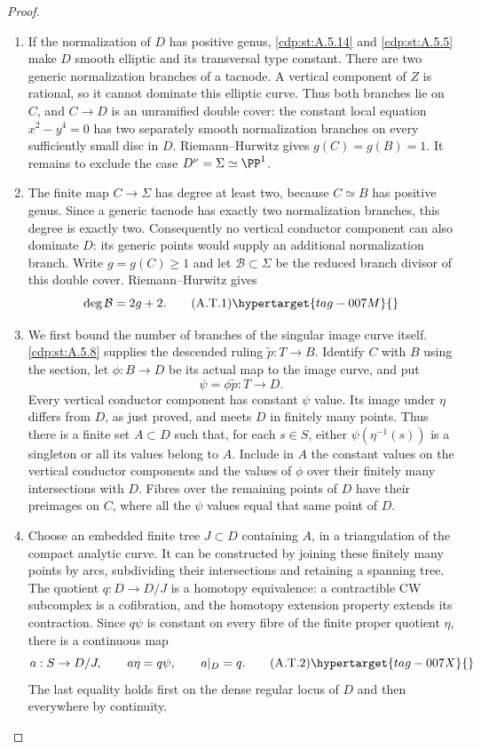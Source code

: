 \begin{proof}

\begin{enumerate}[label={$\langle1\rangle$\arabic*.},leftmargin=*]
\item If the normalization of $D$ has positive genus, \ref{cdp:st:A.5.14}
and \ref{cdp:st:A.5.5} make $D$ smooth elliptic and its transversal
type constant. There are two generic normalization
branches of a tacnode. A vertical component of $Z$
is rational, so it cannot dominate this elliptic curve.
Thus both branches lie on $C$, and $C\to D$ is an
unramified double cover: the constant local equation
$x^2-y^4=0$ has two separately smooth normalization
branches on every sufficiently small disc in $D$.
Riemann--Hurwitz gives $g(C)=g(B)=1$.
It remains to exclude the case $D^\nu=\Sigma\simeq\PP^1$.

\item The finite map $C\to\Sigma$ has degree at least two,
because $C\simeq B$ has positive genus. Since a generic
tacnode has exactly two normalization branches, this
degree is exactly two. Consequently no vertical
conductor component can also dominate $D$: its generic
points would supply an additional normalization branch.
Write $g=g(C)\ge1$ and let $\mathcal B\subset\Sigma$
be the reduced branch divisor of this double cover.
Riemann--Hurwitz gives
\[
                   \deg\mathcal B=2g+2.             \tag{A.T.1}\hypertarget{tag-007M}{}\label{cdp:eq:A.T.1}
\]

\item We first bound the number of branches of the singular
image curve itself. \ref{cdp:st:A.5.8} supplies the descended ruling
$\widetilde p:T\to B$. Identify $C$ with $B$ using the
section, let $\phi:B\to D$ be its actual map to the
image curve, and put
\[
                    \psi=\phi\widetilde p:T\to D.
\]
Every vertical conductor component has constant $\psi$
value. Its image under $\eta$ differs from $D$, as just
proved, and meets $D$ in finitely many points. Thus
there is a finite set $A\subset D$ such that, for each
$s\in S$, either $\psi(\eta^{-1}(s))$ is a singleton
or all its values belong to $A$. Include in $A$ the
constant values on the vertical conductor components
and the values of $\phi$ over their finitely many
intersections with $D$. Fibres over the remaining
points of $D$ have their preimages on $C$, where all
the $\psi$ values equal that same point of $D$.

\item Choose an embedded finite tree $J\subset D$ containing
$A$, in a triangulation of the compact analytic curve.
It can be constructed by joining these finitely many
points by arcs, subdividing their intersections and
retaining a spanning tree. The quotient
$q:D\to D/J$ is a homotopy equivalence: a contractible
CW subcomplex is a cofibration, and the homotopy
extension property extends its contraction. Since
$q\psi$ is constant on every fibre of the finite
proper quotient $\eta$, there is a continuous map
\[
 a:S\to D/J,\qquad a\eta=q\psi,\qquad a|_D=q.     \tag{A.T.2}\hypertarget{tag-007X}{}\label{cdp:eq:A.T.2}
\]
The last equality holds first on the dense regular
locus of $D$ and then everywhere by continuity.


\end{enumerate}
\end{proof}
